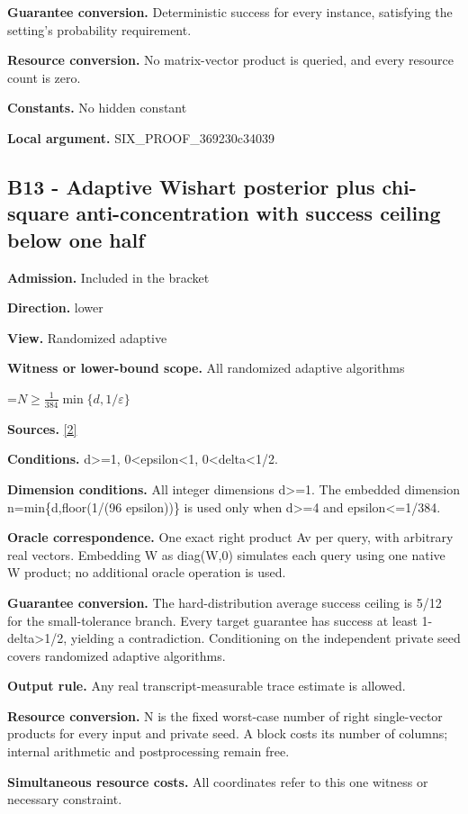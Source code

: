 \documentclass[10pt,a4paper]{article}
\newcommand{\AtlasMath}[1]{\par\begingroup\centering\setbox0=\hbox{$\displaystyle #1$}\ifdim\wd0>1.4\linewidth\typeout{ATLAS WIDE FORMULA: \the\wd0}\fi\ifdim\wd0>\linewidth\resizebox{\linewidth}{!}{\box0}\else\box0\fi\par\endgroup}
\begin{document}
\textbf{Guarantee conversion.} Deterministic success for every instance, satisfying the setting's probability requirement.

\textbf{Resource conversion.} No matrix-vector product is queried, and every resource count is zero.

\textbf{Constants.} No hidden constant

\textbf{Local argument.} SIX\_\allowbreak{}PROOF\_\allowbreak{}369230c34039

\subsection{B13 - Adaptive Wishart posterior plus chi-square anti-concentration with success ceiling below one half}
\textbf{Admission.} Included in the bracket

\textbf{Direction.} lower

\textbf{View.} Randomized adaptive

\textbf{Witness or lower-bound scope.} All randomized adaptive algorithms

\AtlasMath{N\ge\frac{1}{384}\min\{d,1/\varepsilon\}}
\textbf{Sources.} \href{https://arxiv.org/pdf/2402.09379v3}{[2]}

\textbf{Conditions.} d>=1, 0<epsilon<1, 0<delta<1/2.

\textbf{Dimension conditions.} All integer dimensions d>=1. The embedded dimension n=min\{d,floor(1/(96 epsilon))\} is used only when d>=4 and epsilon<=1/384.

\textbf{Oracle correspondence.} One exact right product Av per query, with arbitrary real vectors. Embedding W as diag(W,0) simulates each query using one native W product; no additional oracle operation is used.

\textbf{Guarantee conversion.} The hard-distribution average success ceiling is 5/12 for the small-tolerance branch. Every target guarantee has success at least 1-delta>1/2, yielding a contradiction. Conditioning on the independent private seed covers randomized adaptive algorithms.

\textbf{Output rule.} Any real transcript-measurable trace estimate is allowed.

\textbf{Resource conversion.} N is the fixed worst-case number of right single-vector products for every input and private seed. A block costs its number of columns; internal arithmetic and postprocessing remain free.

\textbf{Simultaneous resource costs.} All coordinates refer to this one witness or necessary constraint.
\end{document}
